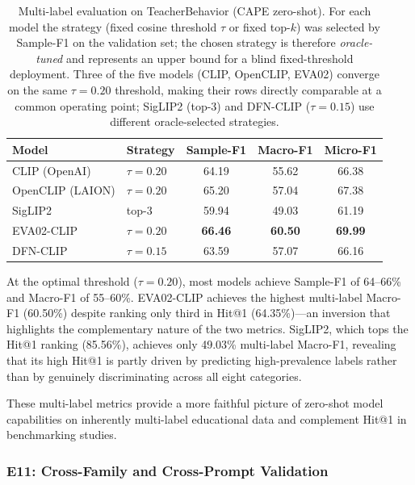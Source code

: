 \documentclass[electronics,article,submit,pdftex,moreauthors]{Definitions/mdpi}
\begin{document}
\begin{table}[H]
\caption{Multi-label evaluation on TeacherBehavior (CAPE zero-shot). For each model the strategy (fixed cosine threshold $\tau$ or fixed top-$k$) was selected by Sample-F1 on the validation set; the chosen strategy is therefore \emph{oracle-tuned} and represents an upper bound for a blind fixed-threshold deployment. Three of the five models (CLIP, OpenCLIP, EVA02) converge on the same $\tau=0.20$ threshold, making their rows directly comparable at a common operating point; SigLIP2 (top-3) and DFN-CLIP ($\tau=0.15$) use different oracle-selected strategies.}
\label{tab:multilabel_eval}
\centering
\small
\begin{tabular}{llccc}
\toprule
\textbf{Model} & \textbf{Strategy} & \textbf{Sample-F1} & \textbf{Macro-F1} & \textbf{Micro-F1} \\
\midrule
CLIP (OpenAI) & $\tau=0.20$ & 64.19 & 55.62 & 66.38 \\
OpenCLIP (LAION) & $\tau=0.20$ & 65.20 & 57.04 & 67.38 \\
SigLIP2 & top-3 & 59.94 & 49.03 & 61.19 \\
EVA02-CLIP & $\tau=0.20$ & \textbf{66.46} & \textbf{60.50} & \textbf{69.99} \\
DFN-CLIP & $\tau=0.15$ & 63.59 & 57.07 & 66.16 \\
\bottomrule
\end{tabular}
\end{table}

At the optimal threshold ($\tau=0.20$), most models achieve Sample-F1 of 64--66\% and Macro-F1 of 55--60\%. EVA02-CLIP achieves the highest multi-label Macro-F1 (60.50\%) despite ranking only third in Hit@1 (64.35\%)---an inversion that highlights the complementary nature of the two metrics. SigLIP2, which tops the Hit@1 ranking (85.56\%), achieves only 49.03\% multi-label Macro-F1, revealing that its high Hit@1 is partly driven by predicting high-prevalence labels rather than by genuinely discriminating across all eight categories.

These multi-label metrics provide a more faithful picture of zero-shot model capabilities on inherently multi-label educational data and complement Hit@1 in benchmarking studies.


\subsubsection{E11: Cross-Family and Cross-Prompt Validation}
\label{sec:e11_ex}
\end{document}
